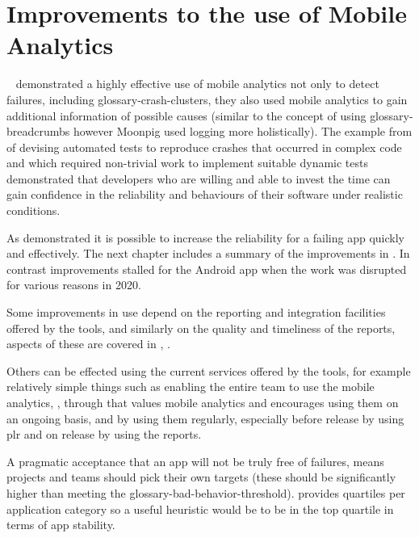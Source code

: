 
\section{Improvements to the use of Mobile Analytics}~\label{aiu-itools}\index{\iuse}
 demonstrated a highly effective use of mobile analytics not only to detect failures, including \glspl{glossary-crash-cluster}, they also used mobile analytics to gain additional information of possible causes (similar to the concept of using \gls{glossary-breadcrumbs} however Moonpig used logging more holistically). The example from  of devising automated tests to reproduce crashes that occurred in complex code and which required non-trivial work to implement suitable dynamic tests demonstrated that developers who are willing and able to invest the time can gain confidence in the reliability and behaviours of their software under realistic conditions.

As  demonstrated it is possible to increase the reliability for a failing app quickly and effectively. The next chapter includes a summary of the improvements in . In contrast improvements stalled for the  Android app when the work was disrupted for various reasons in 2020.

Some improvements in use depend on the reporting and integration facilities offered by the tools, and similarly on the quality and timeliness of the reports, aspects of these are covered in , . 

Others can be effected using the current services offered by the tools, for example relatively simple things such as enabling the entire team to use the mobile analytics, , through  that values mobile analytics and encourages using them on an ongoing basis, and by using them regularly, especially before release by using \acrfull{plr} and on release by using the  reports. 

A pragmatic acceptance that an app will not be truly free of failures, means projects and teams should pick their own targets (these should be significantly higher than meeting the \gls{glossary-bad-behavior-threshold}).  provides quartiles per application category so a useful heuristic would be to be in the top quartile in terms of app stability.

